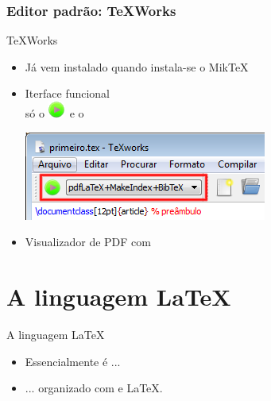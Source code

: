 \begin{frame}
  \frametitle{Editor padrão: TeXWorks}

  \begin{block}{TeXWorks}
    \begin{itemize}
    \item Já vem instalado quando instala-se o Mik\TeX
    \item Iterface funcional\\
      só o  \includegraphics[height=0.6\baselineskip]{./imagens/botao-latex.png}\ 
      e o \medskip

        \centerline{\includegraphics[scale=0.5]{./imagens/texworks-painel.png}}
      \item Visualizador de PDF com 
    \end{itemize}
  \end{block}


\end{frame}




\section{A linguagem \LaTeX}

\begin{frame}

  \begin{block}{A linguagem \LaTeX}
    \begin{itemize}
      \medskip
    \item Essencialmente é  ... \medskip %
    \item ... organizado com  e  \LaTeX.
      \medskip
    \end{itemize}
  \end{block}

\end{frame}

